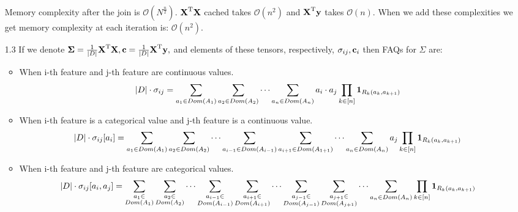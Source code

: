 \documentclass[10pt,a4paper]{article}
\begin{document}
\begin{enumerate}
Memory complexity after the join is
$\mathcal{O}(N^\frac{n}{2})$. $\textbf{\text{{X}}} ^ \text{T}\textbf{\text{{X}}}$ cached takes $\mathcal{O}(n^2)$ and $\textbf{\text{{X}}} ^ \text{T}\textbf{\text{{y}}}$ takes $\mathcal{O}(n)$.
When we add these complexities we get memory complexity at each iteration is:
$\mathcal{O}(n^2)$. 

\item[1.3]
If we denote $\mathbf{\Sigma} = \frac{1}{|D|}\textbf{\text{{X}}} ^ \text{T} \textbf{\text{{X}}}, \textbf{\text{{c}}} = \frac{1}{|D|}\textbf{\text{{X}}} ^ \text{T}\textbf{\text{{y}}}, $
and elements of these tensors, respectively, $\mathbf{\sigma}_{ij}, \textbf{\text{{c}}}_{i}$ then FAQs for $\Sigma$ are: 
\begin{itemize}
\item When i-th feature and j-th feature are continuous values. 
$$|D| \cdot \mathbf{\sigma}_{ij}= \sum_{a_1 \in Dom(A_1)} \sum_{a_2 \in Dom(A_2)} \cdots \sum_{a_n \in Dom(A_n)} a_i \cdot a_j 
\prod_{k\in[n]} \textbf{\text{{1}}}_{R_k(a_k, a_{k+1})}$$
\item When i-th feature is a categorical value and j-th feature is a continuous value. 
$$|D| \cdot \mathbf{\sigma}_{ij}[a_i]= \sum_{a_1 \in Dom(A_1)} \sum_{a_2 \in Dom(A_2)} \cdots 
\sum_{a_{i-1} \in Dom(A_{i-1})}
\sum_{a_{i+1} \in Dom(A_{1+1})}
\cdots
\sum_{a_n \in Dom(A_n)}  a_j 
\prod_{k\in[n]} \textbf{\text{{1}}}_{R_k(a_k, a_{k+1})}$$
\item When i-th feature and j-th feature are categorical values. 
$$|D| \cdot \mathbf{\sigma}_{ij}[a_i, a_j]= 
\sum_{\substack{a_{1} \in \\Dom(A_{1})}}
\sum_{\substack{a_{2} \in \\Dom(A_{2})}}
\cdots 
\sum_{\substack{a_{i-1} \in \\Dom(A_{i-1})}}
\sum_{\substack{a_{i+1} \in \\Dom(A_{i+1})}}
\cdots
\sum_{\substack{a_{j-1} \in \\Dom(A_{j-1})}}
\sum_{\substack{a_{j+1} \in \\Dom(A_{j+1})}}
\cdots
\sum_{a_n \in Dom(A_n)}  
\prod_{k\in[n]} \textbf{\text{{1}}}_{R_k(a_k, a_{k+1})}$$


\end{itemize}
\end{enumerate}
\end{document}
